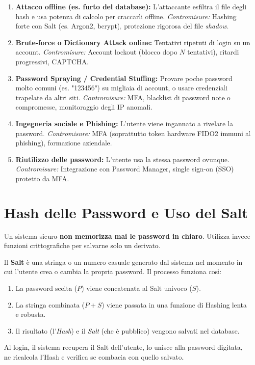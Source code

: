 \begin{warnbox}
\begin{enumerate}
    \item \textbf{Attacco offline (es. furto del database):} L'attaccante esfiltra il file degli hash e usa potenza di calcolo per craccarli offline. \textit{Contromisure:} Hashing forte con Salt (es. Argon2, bcrypt), protezione rigorosa del file \textit{shadow}.
    \item \textbf{Brute-force o Dictionary Attack online:} Tentativi ripetuti di login su un account. \textit{Contromisure:} Account lockout (blocco dopo $N$ tentativi), ritardi progressivi, CAPTCHA.
    \item \textbf{Password Spraying / Credential Stuffing:} Provare poche password molto comuni (es. "123456") su migliaia di account, o usare credenziali trapelate da altri siti. \textit{Contromisure:} MFA, blacklist di password note o compromesse, monitoraggio degli IP anomali.
    \item \textbf{Ingegneria sociale e Phishing:} L'utente viene ingannato a rivelare la password. \textit{Contromisure:} MFA (soprattutto token hardware FIDO2 immuni al phishing), formazione aziendale.
    \item \textbf{Riutilizzo delle password:} L'utente usa la stessa password ovunque. \textit{Contromisure:} Integrazione con Password Manager, single sign-on (SSO) protetto da MFA.
\end{enumerate}
\end{warnbox}

\section{Hash delle Password e Uso del Salt}

Un sistema sicuro \textbf{non memorizza mai le password in chiaro}. Utilizza invece funzioni crittografiche per salvarne solo un derivato. 

\begin{defbox}
Il \textbf{Salt} è una stringa o un numero casuale generato dal sistema nel momento in cui l'utente crea o cambia la propria password. Il processo funziona così:
\begin{enumerate}
    \item La password scelta ($P$) viene concatenata al Salt univoco ($S$).
    \item La stringa combinata ($P + S$) viene passata in una funzione di Hashing lenta e robusta.
    \item Il risultato (l'\textit{Hash}) e il \textit{Salt} (che è pubblico) vengono salvati nel database.
\end{enumerate}
Al login, il sistema recupera il Salt dell'utente, lo unisce alla password digitata, ne ricalcola l'Hash e verifica se combacia con quello salvato.
\end{defbox}

